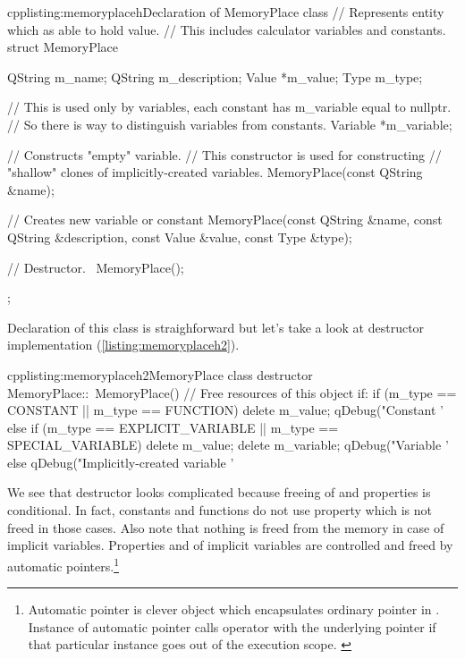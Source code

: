 \begin{fdoccode}{cpp}{listing:memoryplaceh}{Declaration of MemoryPlace class}
// Represents entity which as able to hold value.
// This includes calculator variables and constants.
struct MemoryPlace {
    QString m_name;
    QString m_description;
    Value *m_value;
    Type m_type;

    // This is used only by variables, each constant has m_variable equal to nullptr.
    // So there is way to distinguish variables from constants.
    Variable *m_variable;

    // Constructs "empty" variable.
    // This constructor is used for constructing
    // "shallow" clones of implicitly-created variables.
    MemoryPlace(const QString &name);

    // Creates new variable or constant
    MemoryPlace(const QString &name, const QString &description,
                const Value &value, const Type &type);

    // Destructor.
    ~MemoryPlace();
};
\end{fdoccode}
Declaration of this class is straighforward but let's take a look at destructor implementation (\autoref{listing:memoryplaceh2}).

\begin{fdoccode}{cpp}{listing:memoryplaceh2}{MemoryPlace class destructor}
MemoryPlace::~MemoryPlace() {
  // Free resources of this object if:
  if (m_type == CONSTANT || m_type == FUNCTION) {
    delete m_value;
    qDebug("Constant '%
  }
  else if (m_type == EXPLICIT_VARIABLE || m_type == SPECIAL_VARIABLE) {
    delete m_value;
    delete m_variable;
    qDebug("Variable '%
  }
  else {
    qDebug("Implicitly-created variable '%
  }
}
\end{fdoccode}
We see that destructor looks complicated because freeing of and properties is conditional. In fact, constants and functions do not use property which is not freed in those cases. Also note that nothing is freed from the memory in case of implicit variables. Properties and of implicit variables are controlled and freed by automatic pointers.\footnote{Automatic pointer is clever object which encapsulates ordinary pointer in \cpp. Instance of automatic pointer calls operator with the underlying pointer if that particular instance goes out of the execution scope. \citep[p.~969-978]{prata:cprimer}}

